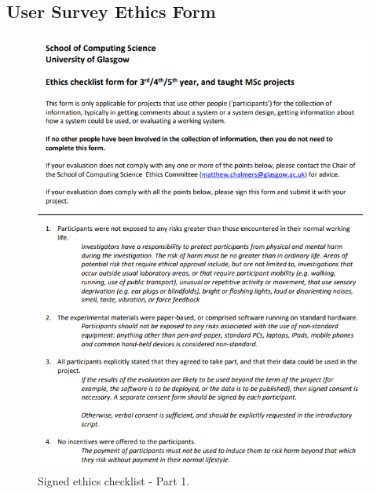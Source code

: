 \documentclass{l4proj}
\begin{document}
\begin{appendices}
\section{User Survey Ethics Form}

\begin{figure}[h]
    \centering
    \includegraphics[width=0.95\linewidth]{images/ethics/checklist-1.png}
	\caption{Signed ethics checklist - Part 1.}
    \label{ethics-1}
\end{figure}


\end{appendices}
\end{document}
